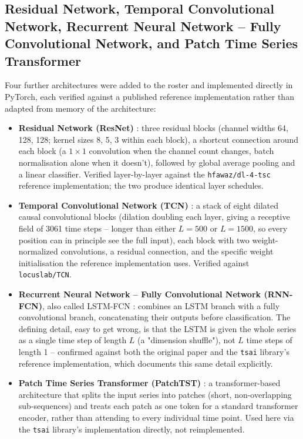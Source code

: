 \subsection{Residual Network, Temporal Convolutional Network, Recurrent Neural Network -- Fully Convolutional Network, and Patch Time Series Transformer}

Four further architectures were added to the roster and implemented directly in PyTorch, each verified against a published reference implementation rather than adapted from memory of the architecture:

\begin{itemize}
    \item \textbf{Residual Network (ResNet)} \citep{wang2017resnet}: three residual blocks (channel widths 64, 128, 128; kernel sizes 8, 5, 3 within each block), a shortcut connection around each block (a $1\times1$ convolution when the channel count changes, batch normalisation alone when it doesn't), followed by global average pooling and a linear classifier. Verified layer-by-layer against the \texttt{hfawaz/dl-4-tsc} reference implementation; the two produce identical layer schedules.
    \item \textbf{Temporal Convolutional Network (TCN)} \citep{bai2018tcn}: a stack of eight dilated causal convolutional blocks (dilation doubling each layer, giving a receptive field of 3061 time steps -- longer than either $L=500$ or $L=1500$, so every position can in principle see the full input), each block with two weight-normalized convolutions, a residual connection, and the specific weight initialisation the reference implementation uses. Verified against \texttt{locuslab/TCN}.
    \item \textbf{Recurrent Neural Network -- Fully Convolutional Network (RNN-FCN)}, also called LSTM-FCN \citep{karim2018lstmfcn}: combines an LSTM branch with a fully convolutional branch, concatenating their outputs before classification. The defining detail, easy to get wrong, is that the LSTM is given the whole series as a single time step of length $L$ (a "dimension shuffle"), not $L$ time steps of length 1 -- confirmed against both the original paper and the \texttt{tsai} library's reference implementation, which documents this same detail explicitly.
    \item \textbf{Patch Time Series Transformer (PatchTST)} \citep{nie2023patchtst}: a transformer-based architecture that splits the input series into patches (short, non-overlapping sub-sequences) and treats each patch as one token for a standard transformer encoder, rather than attending to every individual time point. Used here via the \texttt{tsai} library's implementation directly, not reimplemented.
\end{itemize}

